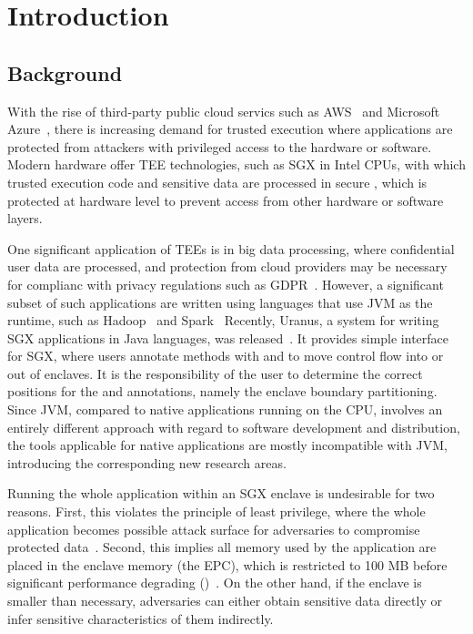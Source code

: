 \section{Introduction}\label{sec:introduction}

\subsection{Background}\label{subsec:background}
With the rise of third-party public cloud servics
such as AWS~\cite{aws} and Microsoft Azure~\cite{azure},
there is increasing demand for trusted execution where
applications are protected from
attackers with privileged access to the hardware or software.
Modern hardware offer TEE technologies,
such as SGX in Intel CPUs,
with which trusted execution code and sensitive data
are processed in secure ,
which is protected at hardware level to prevent access
from other hardware or software layers.

One significant application of TEEs is in big data processing,
where confidential user data are processed,
and protection from cloud providers may be necessary
for complianc with privacy regulations such as GDPR~\cite{gdpr}.
However, a significant subset of such applications are written
using languages that use JVM as the runtime,
such as Hadoop~\cite{apachehadoop} and Spark~\cite{apachespark}
Recently, Uranus, a system for
writing SGX applications in Java languages, was released~\cite{uranus}.
It provides simple interface for SGX,
where users annotate methods with  and 
to move control flow into or out of enclaves.
It is the responsibility of the user to determine the correct positions
for the  and  annotations,
namely the enclave boundary partitioning.
Since JVM, compared to native applications running on the CPU,
involves an entirely different approach
with regard to software development and distribution,
the tools applicable for native applications are mostly incompatible with JVM,
introducing the corresponding new research areas.

Running the whole application within an SGX enclave is undesirable for two reasons.
First, this violates the principle of least privilege,
where the whole application becomes possible attack surface
for adversaries to compromise protected data~\cite{glamdring}.
Second, this implies all memory used by the application
are placed in the enclave memory (the EPC),
which is restricted to 100 MB before significant performance degrading
()~\cite{uranus}.
On the other hand, if the enclave is smaller than necessary,
adversaries can either obtain sensitive data directly or
infer sensitive characteristics of them indirectly.

